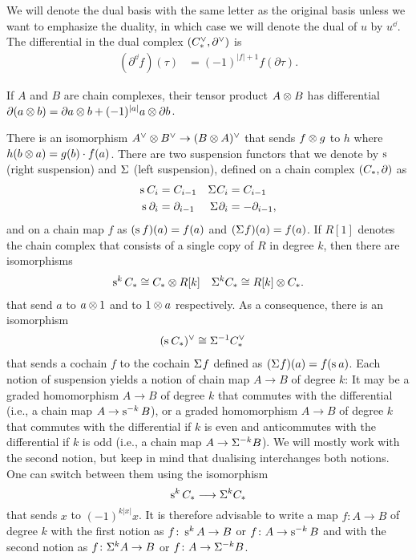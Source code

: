 We will denote the dual basis with the same letter as the original basis unless we want to emphasize the duality, in which case we will denote the dual of $u$ by $u^\dd$. The differential in the dual complex $(\ucocadenas,\partial^\dd)$ is
\begin{align*}
	(\partial^\dd f)(\tau) &= (-1)^{|f|+1} f(\partial \tau). %
\end{align*}
\begin{convention}
	If $A$ and $B$ are chain complexes, their tensor product $A \ot  B$ has differential $\partial(a \ot  b) = \partial a \ot  b + (-1)^{|a|}a \ot  \partial b$.
\end{convention}
	There is an isomorphism $A^\dd \ot  B^\dd\to (B \ot  A)^{\dd}$ that sends $f \ot  g$ to $h$ where $h(b \ot  a) = g(b)\cdot f(a)$. There are two suspension functors that we denote by $\sus{}$ (right suspension) and $\susp{}$ (left suspension), defined on a chain complex $(\ucadenas,\partial)$ as
\begin{align*}
	\sus{} \ucadenas[i] &= \ucadenas[i-1] & \susp{} \ucadenas[i] &= \ucadenas[i-1] \\
	\sus{} \partial_i &= \partial_{i-1} & \susp{} \partial_i &= -\partial_{i-1},
\end{align*}
and on a chain map $f$ as $(\sus{}f)(a) = f(a)$ and $(\susp{} f)(a) = f(a)$. If $R[1]$ denotes the chain complex that consists of a single copy of $R$ in degree $k$, then there are isomorphisms
\begin{align*}
	\sus{k} \ucadenas &\cong \ucadenas \ot  R[k] & \susp{k} \ucadenas \cong R[k] \ot  \ucadenas.
\end{align*}
that send $a$ to $a \ot  1$ and to $1 \ot  a$ respectively. As a consequence, there is an isomorphism
\begin{align*}
(\sus{}\ucadenas )^\dd &\cong \susp{-1}\ucocadenas
\end{align*}
that sends a cochain $f$ to the cochain $\susp{}f$ defined as $(\susp{}f)(a) = f(\sus{}a)$.
Each notion of suspension yields a notion of chain map $A\to B$ of degree $k$: It may be a graded homomorphism $A\to B$ of degree $k$ that commutes with the differential (i.e., a chain map $A\to \sus{-k} B$), or a graded homomorphism $A\to B$ of degree $k$ that commutes with the differential if $k$ is even and anticommutes with the differential if $k$ is odd (i.e., a chain map $A\to \susp{-k}B$). We will mostly work with the second notion, but keep in mind that dualising interchanges both notions. One can switch between them using the isomorphism
\[
\sus{k}\ucadenas \lra \susp{k}\ucadenas
\]
that sends $x$ to $(-1)^{k|x|}x$. It is therefore advisable to write a map $f  \colon  A \to B$ of degree $k$ with the first notion as $f \colon  \sus{k}A \to B$ or $f \colon  A\to \sus{-k}B$ and with the second notion as $f \colon  \susp{k}A\to B$ or $f \colon  A\to \susp{-k}B$.

